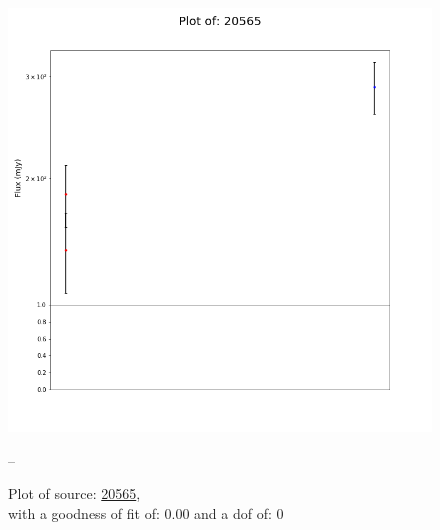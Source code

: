 \documentclass{article}
\begin{document}
\begin{figure}[H]
    \centering
    \begin{minipage}{.5\textwidth}
        \centering
        \includegraphics[scale = 0.35]{KmeulenTrap4P23_1min/1min20565.png}
        \captionsetup{labelformat=empty}
        \caption{Plot of source: \href{http://banana.transientskp.org/r4/vlo_KmeulenTrap4P23/runningcatalog/20565}{20565},\\with a goodness of fit of: 0.00 and a dof of: 0}
        \addtocounter{figure}{-1}
        \label{KmeulenTrap4P23:1min:20565:plot}
    \end{minipage}%
    \begin{minipage}{0.5\textwidth}
        \centering

--
        \end{minipage}
\end{figure}
\end{document}
